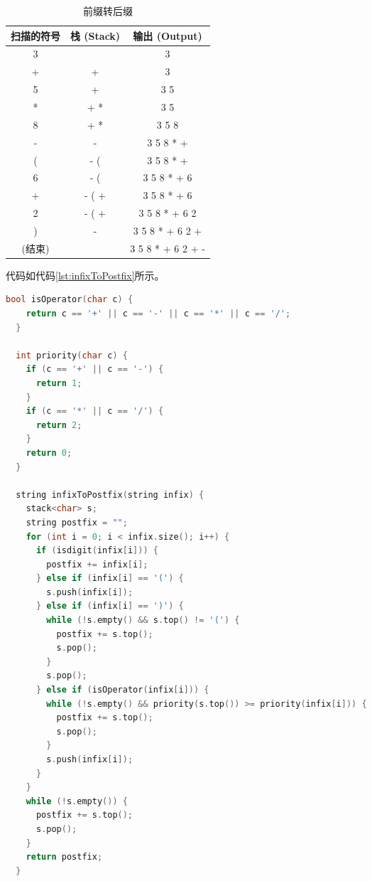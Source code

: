 \documentclass[lang=cn,newtx,10pt,scheme=chinese]{../elegantbook}
\begin{document}
\begin{table}[!htbp]
  \centering
  \begin{tabular}{|c|c|c|}
  \hline
  \textbf{扫描的符号} & \textbf{栈 (Stack)} & \textbf{输出 (Output)} \\ \hline
  3 &  & 3 \\ \hline
  + & + & 3 \\ \hline
  5 & + & 3 5 \\ \hline
  * & + * & 3 5 \\ \hline
  8 & + * & 3 5 8 \\ \hline
  - & - & 3 5 8 * + \\ \hline
  ( & - ( & 3 5 8 * + \\ \hline
  6 & - ( & 3 5 8 * + 6 \\ \hline
  + & - ( + & 3 5 8 * + 6 \\ \hline
  2 & - ( + & 3 5 8 * + 6 2 \\ \hline
  ) & - & 3 5 8 * + 6 2 + \\ \hline
  (结束) &  & 3 5 8 * + 6 2 + - \\ \hline
  \end{tabular}
  \caption{前缀转后缀}
  \label{tab:infixToPostfix}
  \end{table}

代码如代码\ref{lst:infixToPostfix}所示。

\begin{lstlisting}[language=C++, caption={中缀表达式转后缀表达式示例代码}, label={lst:infixToPostfix}]
  bool isOperator(char c) {
    return c == '+' || c == '-' || c == '*' || c == '/';
  }

  int priority(char c) {
    if (c == '+' || c == '-') {
      return 1;
    }
    if (c == '*' || c == '/') {
      return 2;
    }
    return 0;
  }

  string infixToPostfix(string infix) {
    stack<char> s;
    string postfix = "";
    for (int i = 0; i < infix.size(); i++) {
      if (isdigit(infix[i])) {
        postfix += infix[i];
      } else if (infix[i] == '(') {
        s.push(infix[i]);
      } else if (infix[i] == ')') {
        while (!s.empty() && s.top() != '(') {
          postfix += s.top();
          s.pop();
        }
        s.pop();
      } else if (isOperator(infix[i])) {
        while (!s.empty() && priority(s.top()) >= priority(infix[i])) {
          postfix += s.top();
          s.pop();
        }
        s.push(infix[i]);
      }
    }
    while (!s.empty()) {
      postfix += s.top();
      s.pop();
    }
    return postfix;
  }

\end{lstlisting}
\end{document}
